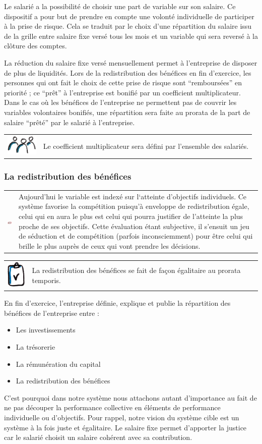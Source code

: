 \documentclass[12pt]{article}
\newcommand{\assemblee}[1]{%
  \begin{tcolorbox}[colframe=DarkPlum,boxrule=2pt,arc=4pt,left=6pt,right=6pt,top=6pt,bottom=6pt,boxsep=0pt,colback=Aluminium1]
    \begin{tabular}{m{1.5cm} m{11cm}}
      \includegraphics[width=1.5cm]{includes/team} & #1 \\
    \end{tabular}
  \end{tcolorbox}
}
\newcommand{\actuel}[1]{%
  \begin{tcolorbox}[colframe=DarkButter,boxrule=2pt,arc=4pt,left=6pt,right=6pt,top=6pt,bottom=6pt,boxsep=0pt,colback=Aluminium1]
    \begin{tabular}{m{1.5cm} m{11cm}}
      \includegraphics[width=1.5cm]{includes/now} & #1 \\
    \end{tabular}
  \end{tcolorbox}
}
\newcommand{\regle}[1]{%
  \begin{tcolorbox}[colframe=DarkOrange,boxrule=2pt,arc=4pt,left=6pt,right=6pt,top=6pt,bottom=6pt,boxsep=0pt,colback=Aluminium1]
    \begin{tabular}{m{1.0cm} m{11.5cm}}
      \includegraphics[width=1.0cm]{includes/rules} & #1 \\
    \end{tabular}
  \end{tcolorbox}
}
\begin{document}
 Le salarié a la possibilité de choisir une part de variable sur son salaire. Ce dispositif a pour but de prendre en compte une volonté individuelle de participer à la prise de risque. Cela se traduit par le choix d’une répartition du salaire issu de la grille entre salaire fixe versé tous les mois et un variable qui sera reversé à la clôture des comptes. 
 
 La réduction du salaire fixe versé mensuellement permet à l’entreprise de disposer de plus de liquidités. Lors de la redistribution des bénéfices en fin d’exercice, les personnes qui ont fait le choix de cette prise de risque sont “remboursées” en priorité ; ce “prêt” à l’entreprise est bonifié par un coefficient multiplicateur. Dans le cas où les bénéfices de l’entreprise ne permettent pas de couvrir les variables volontaires bonifiés, une répartition sera faite au prorata de la part de salaire “prêté” par le salarié à l’entreprise.

 \assemblee{Le coefficient multiplicateur sera défini par l’ensemble des salariés.}

\subsubsection{La redistribution des bénéfices}
\actuel{Aujourd’hui le variable est indexé sur l‘atteinte d’objectifs individuels. Ce système favorise la compétition puisqu’à enveloppe de redistribution égale, celui qui en aura le plus est celui qui pourra justifier de l’atteinte la plus proche de ses objectifs. Cette évaluation étant subjective, il s'ensuit un jeu de séduction et de compétition (parfois inconsciemment) pour être celui qui brille le plus auprès de ceux qui vont prendre les décisions.}

\regle{La redistribution des bénéfices se fait de façon égalitaire au prorata temporis.}
 
 En fin d’exercice, l’entreprise définie, explique et publie la répartition des bénéfices de l’entreprise entre :
 \begin{itemize}
   \item Les investissements
   \item La trésorerie
   \item La rémunération du capital
   \item La redistribution des bénéfices
 \end{itemize}

 C’est pourquoi dans notre système nous attachons autant d’importance au fait de ne pas découper la performance collective en éléments de performance individuelle ou d'objectifs. Pour rappel, notre vision du système cible est un système à la fois juste et égalitaire. Le salaire fixe permet d’apporter la justice car le salarié choisit un salaire cohérent avec sa contribution. 
\end{document}
